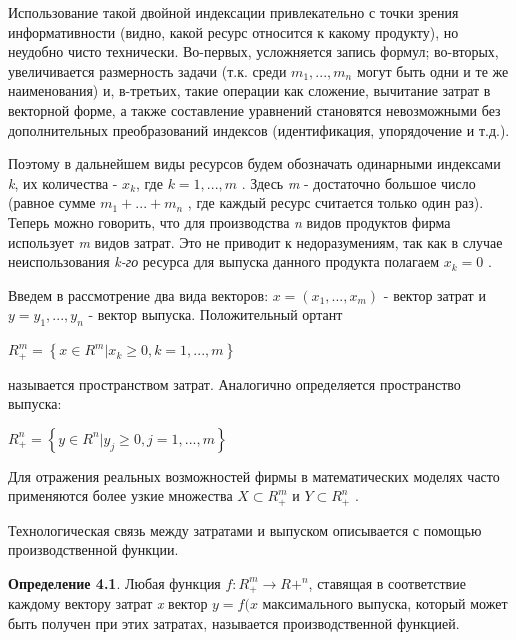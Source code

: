 \documentclass[12pt, 4paper]{book}
\begin{document}
{Использование такой двойной индексации привлекательно с точки зрения информативности (видно, какой ресурс относится к какому продукту), но неудобно чисто технически. Во-первых, усложняется запись формул; во-вторых, увеличивается размерность задачи (т.к. среди $m_1,...,m_n$ могут быть одни и те же наименования) и, в-третьих, такие операции как сложение, вычитание затрат в векторной форме, а также составление уравнений становятся невозможными без дополнительных преобразований индексов (идентификация, упорядочение и т.д.). 
\par

Поэтому в дальнейшем виды ресурсов будем обозначать одинарными индексами \textit{k}, их количества - $x_k$, где $k=1,...,m$ . Здесь \textit{m} - достаточно большое число (равное сумме $m_1+...+m_n$ , где каждый ресурс считается только один раз). Теперь можно говорить, что для производства \textit{n} видов продуктов фирма использует \textit{m} видов затрат. Это не приводит к недоразумениям, так как в случае неиспользования \textit{k-го} ресурса для выпуска данного продукта полагаем $x_k=0$ . 
\par

Введем в рассмотрение два вида векторов: $x=(x_1,...,x_m)$ - вектор затрат и $y=y_1,...,y_n$ - вектор выпуска. Положительный ортант 
\begin{center}
$R_{+}^{m}=\left\{x \in R^{m}| x_k \geq 0 ,k=1,...,m\right\}$
\end{center}
называется пространством затрат. Аналогично определяется пространство выпуска: 
\begin{center}
$R_{+}^{n}=\left\{y \in R^{n}| y_j \geq 0 ,j=1,...,m\right\}$
\end{center}
\par

Для отражения реальных возможностей фирмы в математических моделях часто применяются более узкие множества $X \subset R_{+}^{m}$ и $Y \subset R_{+}^{n}$ . 
\par

Технологическая связь между затратами и выпуском описывается с помощью производственной функции. 
\par

\textbf{Определение 4.1}. Любая функция $f : R_{+}^{m} \rightarrow R{+}^{n}$, ставящая в соответствие каждому вектору затрат \textit{x} вектор $y=f(x$ максимального выпуска, который может быть получен при этих затратах, называется производственной функцией. 
\par

}
\end{document}
